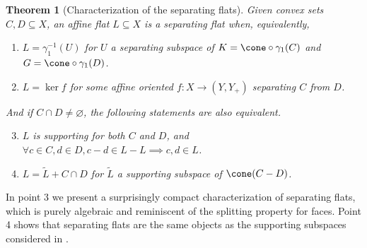 \documentclass{article}
\theoremstyle{plain}
\newtheorem{theorem}{Theorem}[section]
\theoremstyle{definition}
\theoremstyle{remark}
\begin{document}
\begin{theorem}[Characterization of the separating flats]
\label{loc:characterization_of_the_separating_flats.statement}
Given convex sets $C, D \subseteq X$, an affine flat $L \subseteq X$ is a separating flat when,
equivalently,
\begin{enumerate}
\item $L = \gamma_1^{-1}(U)$ for $U$ a separating subspace of $K = \cone \circ \gamma_1(C)$ and $G = \cone \circ \gamma_1(D)$.
\item $L = \ker f$ for some affine oriented $f:X \to (Y, Y_+)$ separating $C$ from $D$.
\end{enumerate}

And if $C \cap D \neq \varnothing$, the following statements are also equivalent.

\begin{enumerate}
\setcounter{enumi}{2}
\item $L$ is supporting for both $C$ and $D$, and $\forall c  \in C, d  \in D, c-d \in L-L \implies c,d \in L$.
\item $L =  \tilde{L} + C \cap D$ for $\tilde{L}$ a supporting subspace of $\cone(C-D)$.
\end{enumerate}
\end{theorem}
In point 3 we present a surprisingly compact characterization of
separating flats, which is purely algebraic and reminiscent of the
splitting property for faces.
Point 4 shows that separating flats are the same objects as the supporting
subspaces considered in \cite{scottBilateralFacialReduction2026}.
\end{document}
